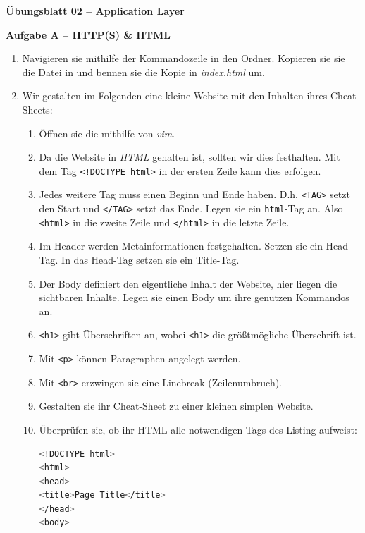 \documentclass[paper=a4,fontsize=11pt]{scrartcl}%
\numberwithin{equation}{section}
\begin{document}
\begin{center}
\Large{\textbf{Übungsblatt 02 --  Application Layer}}
\end{center}

\begin{center}\Large{\textbf{Aufgabe A -- HTTP(S) \& HTML}}\end{center}\vskip0.25in
\begin{enumerate}
	\item Navigieren sie mithilfe der Kommandozeile in den  Ordner. Kopieren sie sie die Datei in  und bennen sie die Kopie in \emph{index.html} um.
	\item Wir gestalten im Folgenden eine kleine Website mit den Inhalten ihres Cheat-Sheets:
	\begin{enumerate}
		\item Öffnen sie die  mithilfe von \emph{vim}.
		\item Da die Website in \emph{HTML} gehalten ist, sollten wir dies festhalten. Mit dem Tag \texttt{<!DOCTYPE html>} in der ersten Zeile kann dies erfolgen. 
		\item Jedes weitere Tag muss einen Beginn und Ende haben. D.h. \texttt{<TAG>} setzt den Start und \texttt{</TAG>} setzt das Ende. Legen sie ein \texttt{html}-Tag an. Also \texttt{<html>} in die zweite Zeile und \texttt{</html>} in die letzte Zeile.
		\item Im Header werden Metainformationen festgehalten. Setzen sie ein Head-Tag. In das Head-Tag setzen sie ein Title-Tag.
		\item Der Body definiert den eigentliche Inhalt der Website, hier liegen die sichtbaren Inhalte. Legen sie einen Body um ihre genutzen Kommandos an.
		\item \texttt{<h1>} gibt Überschriften an, wobei \texttt{<h1>} die größtmögliche Überschrift ist.
		\item Mit \texttt{<p>} können Paragraphen angelegt werden.
		\item Mit \texttt{<br>} erzwingen sie eine Linebreak (Zeilenumbruch).
		\item Gestalten sie ihr Cheat-Sheet zu einer kleinen simplen Website.
		\item Überprüfen sie, ob ihr HTML alle notwendigen Tags des Listing aufweist:
		\begin{lstlisting}[style=Bash, language=Bash]
 <!DOCTYPE html>
<html>
<head>
<title>Page Title</title>
</head>
<body>


\end{lstlisting}
\end{enumerate}
\end{enumerate}
\end{document}
